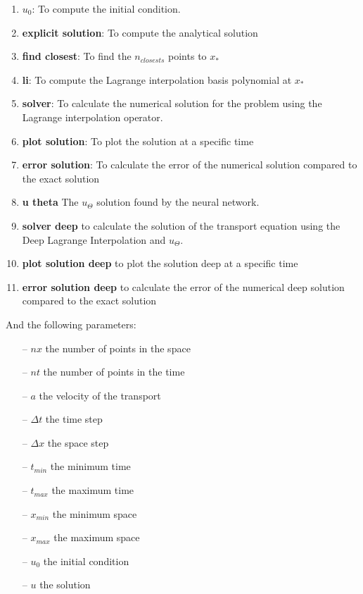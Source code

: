 \documentclass{article}
\begin{document}
\begin{enumerate}
   \item \textbf{$u_0$}: To compute the initial condition.
   \item \textbf{explicit solution}: To compute the analytical solution
   \item \textbf{find closest}: To find the $n_{closests}$ points to $x_{*}$
   \item \textbf{li}: To compute the Lagrange interpolation basis polynomial at $x_{*}$
   \item \textbf{solver}: To calculate the numerical solution for the problem using the Lagrange interpolation operator.
   \item \textbf{plot solution}: To plot the solution at a specific time
   \item \textbf{error solution}: To calculate the error of the numerical solution compared to the exact solution
   \item \textbf{u theta}  The $u_{\Theta}$ solution found by the neural network.
   \item \textbf{solver deep} to calculate the solution of the transport equation using the Deep Lagrange Interpolation and $u_{\Theta}$.
   \item \textbf{plot solution deep} to plot the solution deep at a specific time
   \item \textbf{error solution deep} to calculate the error of the numerical deep solution compared to the exact solution
\end{enumerate}

And the following parameters: 

\begin{itemize}
    \item[--] $nx$ the number of points in the space
    \item[--] $nt$ the number of points in the time
    \item[--] $a$ the velocity of the transport
    \item[--] $\Delta t$ the time step
    \item[--] $\Delta x$ the space step
    \item[--] $t_{min}$ the minimum time
    \item[--] $t_{max}$ the maximum time
    \item[--] $x_{min}$ the minimum space
    \item[--] $x_{max}$ the maximum space
    \item[--] $u_0$ the initial condition
    \item[--] $u$ the solution
 \end{itemize}
\end{document}
